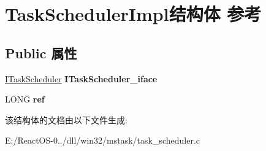 \hypertarget{struct_task_scheduler_impl}{}\section{Task\+Scheduler\+Impl结构体 参考}
\label{struct_task_scheduler_impl}
\subsection*{Public 属性}
\begin{DoxyCompactItemize}
\item 
\mbox{\label{struct_task_scheduler_impl_a8d0a80e82a11ab10bee9fbe30d6703cf}} 
\hyperlink{interface_i_task_scheduler}{I\+Task\+Scheduler} {\bfseries I\+Task\+Scheduler\+\_\+iface}
\item 
\mbox{\label{struct_task_scheduler_impl_a6f4191ba6a7787a150532ba079462f01}} 
L\+O\+NG {\bfseries ref}
\end{DoxyCompactItemize}


该结构体的文档由以下文件生成\+:\begin{DoxyCompactItemize}
\item 
E\+:/\+React\+O\+S-\/0../dll/win32/mstask/task\+\_\+scheduler.\+c\end{DoxyCompactItemize}
